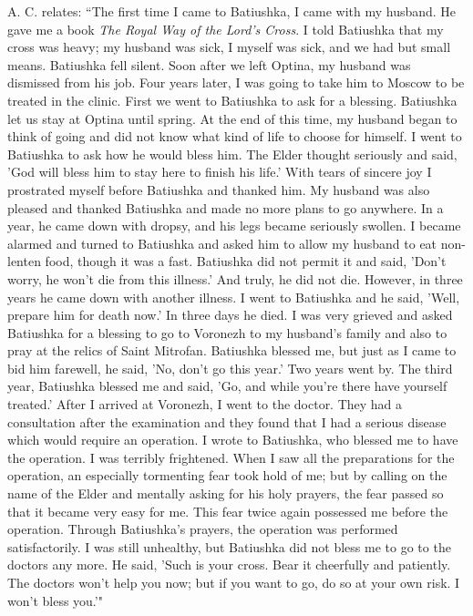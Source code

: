 A. C. relates: “The first time I came to Batiushka, I came with my husband. He gave me a book \textit{The Royal Way of the Lord's Cross}. I told Batiushka that my cross was heavy; my husband was sick, I myself was sick, and we had but small means. Batiushka fell silent. Soon after we left Optina, my husband was dismissed from his job. Four years later, I was going to take him to Moscow to be treated in the clinic. First we went to Batiushka to ask for a blessing. Batiushka let us stay at Optina until spring. At the end of this time, my husband began to think of going and did not know what kind of life to choose for himself. I went to Batiushka to ask how he would bless him. The Elder thought seriously and said, 'God will bless him to stay here to finish his life.' With tears of sincere joy I prostrated myself before Batiushka and thanked him. My husband was also pleased and thanked Batiushka and made no more plans to go anywhere. In a year, he came down with dropsy, and his legs became seriously swollen. I became alarmed and turned to Batiushka and asked him to allow my husband to eat non-lenten food, though it was a fast. Batiushka did not permit it and said, 'Don't worry, he won't die from this illness.' And truly, he did not die. However, in three years he came down with another illness. I went to Batiushka and he said, 'Well, prepare him for death now.' In three days he died. I was very grieved and asked Batiushka for a blessing to go to Voronezh to my husband's family and also to pray at the relics of Saint Mitrofan. Batiushka blessed me, but just as I came to bid him farewell, he said, 'No, don't go this year.' Two years went by. The third year, Batiushka blessed me and said, 'Go, and while you're there have yourself treated.' After I arrived at Voronezh, I went to the doctor. They had a consultation after the examination and they found that I had a serious disease which would require an operation. I wrote to Batiushka, who blessed me to have the operation. I was terribly frightened. When I saw all the preparations for the operation, an especially tormenting fear took hold of me; but by calling on the name of the Elder and mentally asking for his holy prayers, the fear passed so that it became very easy for me. This fear twice again possessed me before the operation. Through Batiushka's prayers, the operation was performed satisfactorily. I was still unhealthy, but Batiushka did not bless me to go to the doctors any more. He said, 'Such is your cross. Bear it cheerfully and patiently. The doctors won't help you now; but if you want to go, do so at your own risk. I won't bless you.'"

